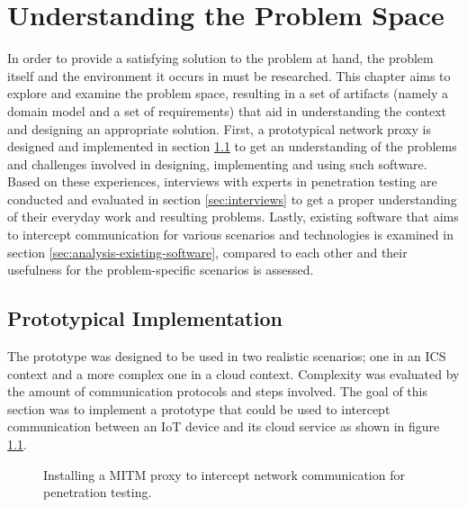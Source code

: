 \chapter{Understanding the Problem Space}
\label{chap:understanding-the-problem-space}
In order to provide a satisfying solution to the problem at hand, the problem itself and the environment it occurs in must be researched. This chapter aims to explore and examine the problem space, resulting in a set of artifacts (namely a domain model and a set of requirements) that aid in understanding the context and designing an appropriate solution. First, a prototypical network proxy is designed and implemented in section \ref{sec:prototypical-implementation} to get an understanding of the problems and challenges involved in designing, implementing and using such software. Based on these experiences, interviews with experts in penetration testing are conducted and evaluated in section \ref{sec:interviews} to get a proper understanding of their everyday work and resulting problems. Lastly, existing software that aims to intercept communication for various scenarios and technologies is examined in section \ref{sec:analysis-existing-software}, compared to each other and their usefulness for the problem-specific scenarios is assessed.

\section{Prototypical Implementation}
\label{sec:prototypical-implementation}
The prototype was designed to be used in two realistic scenarios; one in an \ac{ICS} context and a more complex one in a cloud context. Complexity was evaluated by the amount of communication protocols and steps involved. The goal of this section was to implement a prototype that could be used to intercept communication between an \ac{IoT} device and its cloud service as shown in figure \ref{fig:network-communication-diagrams}.   

\begin{figure}%
    \centering
    \qquad
    \caption{Installing a \ac{MITM} proxy to intercept network communication for penetration testing.}%
    \label{fig:network-communication-diagrams}%
\end{figure}

